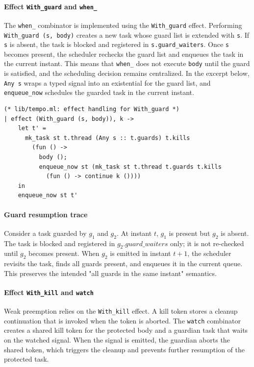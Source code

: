 \paragraph{Effect \texttt{With\_guard} and \texttt{when\_}}
The \texttt{when\_} combinator is implemented using the \texttt{With\_guard}
effect. Performing \texttt{With\_guard (s, body)} creates a new task whose
guard list is extended with \texttt{s}. If \texttt{s} is absent, the task is
blocked and registered in \texttt{s.guard\_waiters}. Once \texttt{s} becomes
present, the scheduler rechecks the guard list and enqueues the task in the
current instant. This means that \texttt{when\_} does not execute \texttt{body}
until the guard is satisfied, and the scheduling decision remains centralized.
In the excerpt below, \texttt{Any s} wraps a typed signal into an existential
for the guard list, and \texttt{enqueue\_now} schedules the guarded task in the
current instant.
\begin{lstlisting}[style=tempo]
(* lib/tempo.ml: effect handling for With_guard *)
| effect (With_guard (s, body)), k ->
    let t' =
      mk_task st t.thread (Any s :: t.guards) t.kills
        (fun () ->
          body ();
          enqueue_now st (mk_task st t.thread t.guards t.kills
            (fun () -> continue k ())))
    in
    enqueue_now st t'
\end{lstlisting}

\paragraph{Guard resumption trace}
Consider a task guarded by $g_1$ and $g_2$. At instant $t$, $g_1$ is present
but $g_2$ is absent. The task is blocked and registered in $g_2.guard\_waiters$
only; it is not re-checked until $g_2$ becomes present. When $g_2$ is emitted
in instant $t{+}1$, the scheduler revisits the task, finds all guards present,
and enqueues it in the current queue. This preserves the intended "all guards
in the same instant" semantics.

\paragraph{Effect \texttt{With\_kill} and \texttt{watch}}
Weak preemption relies on the \texttt{With\_kill} effect. A kill token stores a
cleanup continuation that is invoked when the token is aborted. The \texttt{watch}
combinator creates a shared kill token for the protected body and a guardian
task that waits on the watched signal. When the signal is emitted, the guardian
aborts the shared token, which triggers the cleanup and prevents further
resumption of the protected task.


